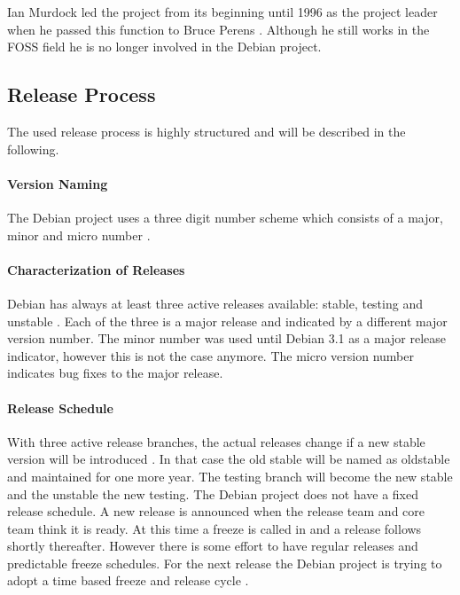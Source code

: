 Ian Murdock led the project from its beginning until 1996 as the project
leader when he passed this function to Bruce Perens
\cite{DebianFAQ,DebianHistory}. Although he still works in the \ac{FOSS} field
he is no longer involved in the Debian project.

\subsection{Release Process}

The used release process is highly structured and will be described in the
following.

\paragraph{Version Naming}

The Debian project uses a three digit number scheme which consists of a major,
minor and micro number \cite{DebianReleases}.

\paragraph{Characterization of Releases}

Debian has always at least three active releases available: stable, testing and
unstable \cite{DebianReleases,DebianReleaseManagement}. Each of the three is a
major release and indicated by a different major version number. The minor
number was used until Debian 3.1 as a major release indicator, however this is
not the case anymore. The micro version number indicates bug fixes to the major
release.

\paragraph{Release Schedule}

With three active release branches, the actual releases change if a new stable
version will be introduced
\cite{McGovern2011,DebianReleaseManagement,DebianReleaseGoals}. In that case
the old stable will be named as oldstable and maintained for one more year. The
testing branch will become the new stable and the unstable the new testing. The
Debian project does not have a fixed release schedule. A new release is
announced when the release team and core team think it is ready. At this time a
freeze is called in and a release follows shortly thereafter. However there is
some effort to have regular releases and predictable freeze schedules. For the
next release the Debian project is trying to adopt a time based freeze and
release cycle \cite{McGovern2011}.

